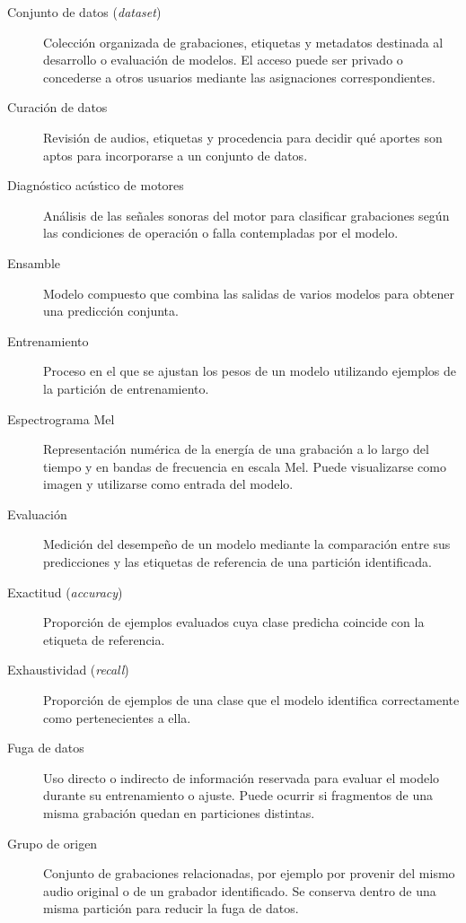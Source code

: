 \begin{description}
    \item[Conjunto de datos (\textit{dataset})] Colección organizada de
    grabaciones, etiquetas y metadatos destinada al desarrollo o evaluación
    de modelos. El acceso puede ser privado o concederse a otros usuarios
    mediante las asignaciones correspondientes.

    \item[Curación de datos] Revisión de audios, etiquetas y procedencia
    para decidir qué aportes son aptos para incorporarse a un conjunto de
    datos.

    \item[Diagnóstico acústico de motores] Análisis de las señales sonoras
    del motor para clasificar grabaciones según las condiciones de operación
    o falla contempladas por el modelo.

    \item[Ensamble] Modelo compuesto que combina las salidas de varios
    modelos para obtener una predicción conjunta.

    \item[Entrenamiento] Proceso en el que se ajustan los pesos de un modelo
    utilizando ejemplos de la partición de entrenamiento.

    \item[Espectrograma Mel] Representación numérica de la energía de una
    grabación a lo largo del tiempo y en bandas de frecuencia en escala Mel.
    Puede visualizarse como imagen y utilizarse como entrada del modelo.

    \item[Evaluación] Medición del desempeño de un modelo mediante la
    comparación entre sus predicciones y las etiquetas de referencia de
    una partición identificada.

    \item[Exactitud (\textit{accuracy})] Proporción de ejemplos evaluados
    cuya clase predicha coincide con la etiqueta de referencia.

    \item[Exhaustividad (\textit{recall})] Proporción de ejemplos de una
    clase que el modelo identifica correctamente como pertenecientes a ella.

    \item[Fuga de datos] Uso directo o indirecto de información reservada
    para evaluar el modelo durante su entrenamiento o ajuste. Puede ocurrir
    si fragmentos de una misma grabación quedan en particiones distintas.

    \item[Grupo de origen] Conjunto de grabaciones relacionadas, por ejemplo
    por provenir del mismo audio original o de un grabador identificado.
    Se conserva dentro de una misma partición para reducir la fuga de datos.


\end{description}
